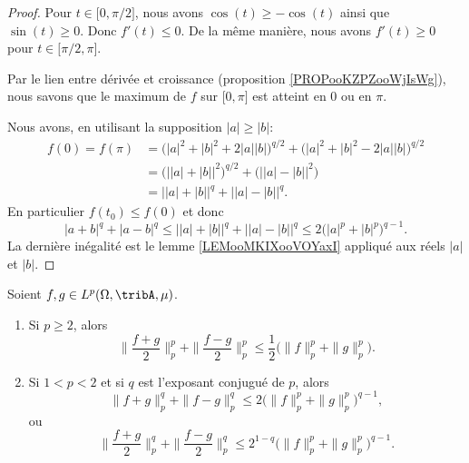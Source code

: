 \begin{proof}
	Pour \( t\in\mathopen[ 0 , \pi/2 \mathclose]\), nous avons \( \cos(t)\geq -\cos(t)\) ainsi que \( \sin(t)\geq 0\). Donc \( f'(t)\leq 0\). De la même manière, nous avons \( f'(t)\geq 0\) pour \( t\in\mathopen[ \pi/2 , \pi \mathclose]\).

	Par le lien entre dérivée et croissance (proposition \ref{PROPooKZPZooWjIsWg}), nous savons que le maximum de \( f\) sur \( \mathopen[ 0 , \pi \mathclose]\) est atteint en \( 0\) ou en \( \pi\).

	Nous avons, en utilisant la supposition \( | a |\geq | b |\):
	\begin{subequations}
		\begin{align}
			f(0)=f(\pi) & =\big( | a |^2+| b |^2+2| a | |b | \big)^{q/2}+\big( | a |^2+| b |^2-2| a | |b | \big)^{q/2} \\
			            & =\big( \big| | a |+| b |\big|^2 \big)^{q/2}+\Big( \big| | a |-| b | \big|^2 \Big)            \\
			            & =\big| | a |+| b | \big|^q+\big| | a |-| b | \big|^q.
		\end{align}
	\end{subequations}
	En particulier \( f(t_0)\leq f(0)\) et donc
	\begin{equation}
		| a+b |^q+| a-b |^q\leq \big| | a |+| b | \big|^q+\big| | a |-| b | \big|^q\leq 2\big( | a |^p+| b |^p \big)^{q-1}.
	\end{equation}
	La dernière inégalité est le lemme \ref{LEMooMKIXooVOYaxI} appliqué aux réels \( | a |\) et \( | b |\).
\end{proof}

\begin{proposition}      \label{PROPooJDOQooWsGlkr}
	Soient \( f,g\in L^p(\Omega,\tribA,\mu)\).
	\begin{enumerate}
		\item
		      Si \( p\geq 2\), alors
		      \begin{equation}        \label{EQooBWDJooGXzdxz}
			      \| \frac{ f+g }{2} \|_p^p+\| \frac{ f-g }{2} \|_p^p\leq \frac{ 1 }{2}\Big( \| f \|_p^p+\| g \|_p^p \Big).
		      \end{equation}
		\item
		      Si \( 1<p<2\) et si \( q\) est l'exposant conjugué de \( p\), alors
		      \begin{equation}        \label{EQooXMWBooYrvaoV}
			      \| f+g \|_p^q+\| f-g \|_p^q\leq 2\Big( \| f \|_p^p +\| g \|_p^p \Big)^{q-1},
		      \end{equation}
		      ou
		      \begin{equation}        \label{EQooZCWDooBnaMom}
			      \| \frac{ f+g }{2} \|_p^q+\| \frac{ f-g }{2} \|_p^q\leq 2^{1-q}\big( \| f \|_p^p+\| g \|_p^p \big)^{q-1}.
		      \end{equation}
	\end{enumerate}
\end{proposition}

